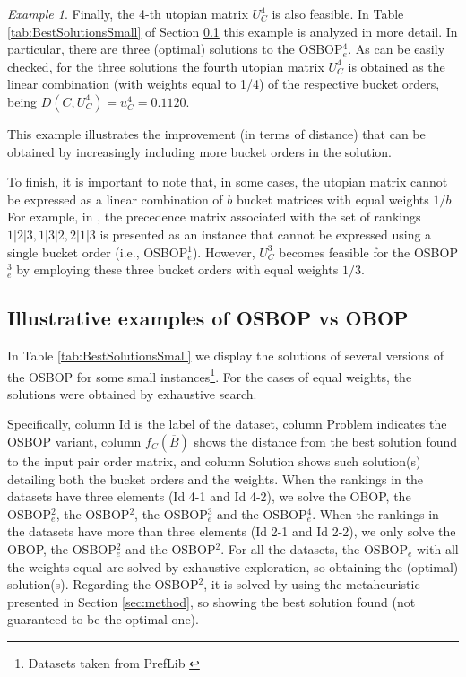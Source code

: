 \documentclass[preprint,12pt]{article}
\theoremstyle{definition}
\theoremstyle{remark}
\theoremstyle{example} %
\newtheorem{example}{Example}[section]
\begin{document}
\begin{example}
Finally, the 4-th utopian matrix $U_C^4$ is also feasible.
In Table \ref{tab:BestSolutionsSmall} of Section \ref{ILL} this example is analyzed in more detail. In particular, there are three (optimal) solutions to the {\rm OSBOP}$_e^4$. As can be easily checked, for the three solutions the fourth utopian matrix $U_C^4$ is obtained as the linear combination (with weights equal to 1/4) of the respective bucket orders, being $D(C, U_C^4)=u_C^4=0.1120$.


This example illustrates the improvement (in terms of distance) that can be obtained by increasingly including more bucket orders in the solution.


To finish, it is important to note that, in some cases, the utopian matrix cannot be expressed as a linear combination of $b$ bucket matrices with equal weights  $1/b$. For example, in \cite{Aledo2017Utopia}, the precedence matrix associated with the set of rankings ${1|2|3, 1|3|2, 2|1|3}$ is presented as an instance that cannot be expressed using a single bucket order (i.e., {\rm OSBOP}$^1_e$). However, $U_C^3$ becomes feasible for the {\rm OSBOP}$_e^3$ by employing these three bucket orders with equal weights $1/3$.
\end{example}





\subsection{Illustrative examples of {\rm OSBOP} vs {\rm OBOP}}\label{ILL}

In  Table \ref{tab:BestSolutionsSmall} we display the solutions of several versions of the OSBOP for some small instances\footnote{Datasets taken from PrefLib \cite{Mattei2013}}. For the cases  of equal weights, the solutions were obtained by exhaustive search. 

Specifically, column Id is the label of the dataset, column Problem indicates the OSBOP variant, 
column $f_C(\overline{B})$ shows the distance from the best solution found to the input pair order matrix, and column Solution shows such solution(s) detailing both the bucket orders and the weights. When the rankings in the datasets have three elements (Id 4-1 and Id 4-2), we solve the OBOP, the OSBOP$_e^2$, the OSBOP$^2$, the OSBOP$_e^3$ and the OSBOP$_e^4$. 
When the rankings in the datasets have more than three elements (Id 2-1 and Id 2-2), we only solve the  OBOP, the OSBOP$_e^2$ and the OSBOP$^2$. For all the datasets, the OSBOP$_e$ with all the weights equal are solved by exhaustive exploration, so obtaining the (optimal) solution(s). Regarding the OSBOP$^2$, it is solved by using the metaheuristic presented in Section \ref{sec:method}, so showing  the best solution found (not guaranteed to be the optimal one).  
\end{document}
